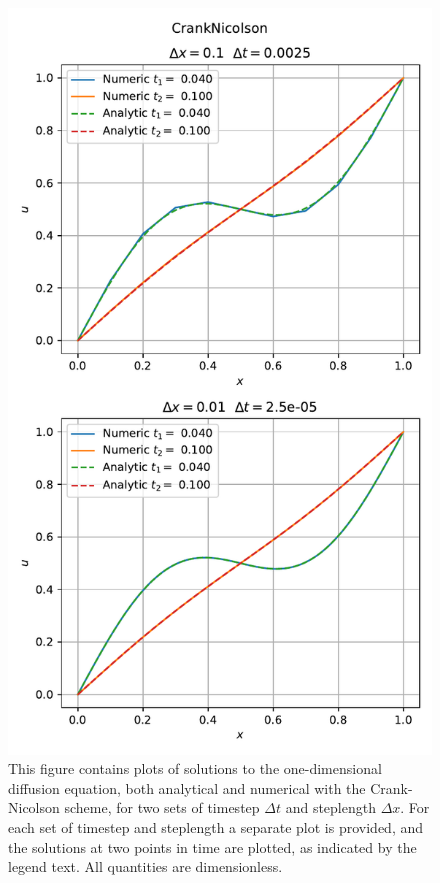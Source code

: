 \documentclass[reprint,english,notitlepage]{revtex4-1}  %
\begin{document}
\begin{figure}[H]
\centering
\includegraphics[width=\columnwidth]{../data/CrankNicolson.pdf}
\caption{This figure contains plots of solutions to the one-dimensional diffusion equation, both analytical and numerical with the Crank-Nicolson scheme, for two sets of timestep $\Delta t$ and steplength $\Delta x$. For each set of timestep and steplength a separate plot is provided, and the solutions at two points in time are plotted, as indicated by the legend text. All quantities are dimensionless.} \label{fig:crank_nicolson_solution}
\end{figure}
\end{document}
